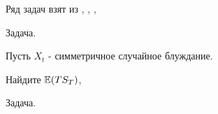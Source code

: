 {%

















Ряд задач взят из \cite{stirzaker:prp}, \cite{stirzaker:otep}, \cite{zastawniak:bsp}, \cite{blom:pspt}


Задача.


Пусть $X_{t}$ - симметричное случайное блуждание.

Найдите $\mathbb{E}(TS_{T})$,

Задача. \cite{wilmott:chap} %

}
